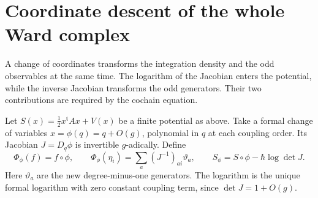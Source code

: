 \section{Coordinate descent of the whole Ward complex}
\label{sec:vol2-ward-coordinates}

A change of coordinates transforms the integration density
and the odd observables at the same time. The logarithm of
the Jacobian enters the potential, while the inverse Jacobian
transforms the odd generators. Their two contributions are
required by the cochain equation.

Let $S(x)=\tfrac12x^{\mathrm t}Ax+V(x)$ be a finite potential
as above. Take a formal change of variables
$x=\phi(q)=q+O(g)$, polynomial in $q$ at each coupling order.
Its Jacobian $J=D_q\phi$ is invertible $g$-adically. Define
\begin{equation}\label{eq:vol2-coordinate-pullback}
 \Phi_\phi(f)=f\circ\phi,\qquad
 \Phi_\phi(\eta_i)=\sum_a(J^{-1})_{ai}\vartheta_a,
 \qquad
 S_\phi=S\circ\phi-\hbar\log\det J.
\end{equation}
Here $\vartheta_a$ are the new degree-minus-one generators.
The logarithm is the unique formal logarithm with zero
constant coupling term, since $\det J=1+O(g)$.

